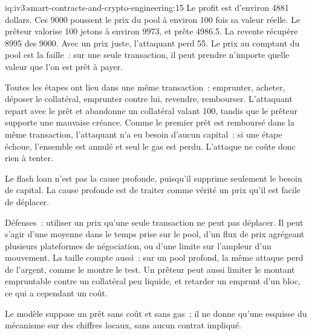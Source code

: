 \begin{solution}{iq:iv3:smart-contracts-and-crypto-engineering:15}
Le profit est d'environ 4881 dollars. Ces 9000 poussent le prix du pool à environ 100 fois sa valeur réelle. Le prêteur valorise 100 jetons à environ 9973, et prête 4986.5. La revente récupère 8995 des 9000. Avec un prix juste, l'attaquant perd 55. Le prix au comptant du pool est la faille~: sur une seule transaction, il peut prendre n'importe quelle valeur que l'on est prêt à payer.
\label{lst:iv3:cr:oracle}

Toutes les étapes ont lieu dans une même transaction~: emprunter, acheter, déposer le collatéral, emprunter contre lui, revendre, rembourser. L'attaquant repart avec le prêt et abandonne un collatéral valant 100, tandis que le prêteur supporte une mauvaise créance. Comme le premier prêt est remboursé dans la même transaction, l'attaquant n'a eu besoin d'aucun capital~; si une étape échoue, l'ensemble est annulé et seul le gas est perdu. L'attaque ne coûte donc rien à tenter.

Le flash loan n'est pas la cause profonde, puisqu'il supprime seulement le besoin de capital. La cause profonde est de traiter comme vérité un prix qu'il est facile de déplacer.

Défenses~: utiliser un prix qu'une seule transaction ne peut pas déplacer. Il peut s'agir d'une moyenne dans le temps prise sur le pool, d'un flux de prix agrégeant plusieurs plateformes de négociation, ou d'une limite sur l'ampleur d'un mouvement. La taille compte aussi~: sur un pool profond, la même attaque perd de l'argent, comme le montre le test. Un prêteur peut aussi limiter le montant empruntable contre un collatéral peu liquide, et retarder un emprunt d'un bloc, ce qui a cependant un coût.

Le modèle suppose un prêt sans coût et sans gas~; il ne donne qu'une esquisse du mécanisme sur des chiffres locaux, sans aucun contrat impliqué.

\end{solution}

